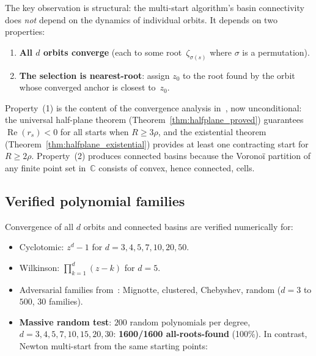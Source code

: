 \documentclass[10pt,a4paper,oneside]{book}
\theoremstyle{definition}
\theoremstyle{remark}
\begin{document}
The key observation is structural: the multi-start algorithm's basin connectivity does \emph{not} depend on the dynamics of individual orbits.  It depends on two properties:
\begin{enumerate}[nosep]
\item \textbf{All $d$ orbits converge} (each to some root~$\zeta_{\sigma(s)}$ where $\sigma$ is a permutation).
\item \textbf{The selection is nearest-root}: assign $z_0$ to the root found by the orbit whose converged anchor is closest to~$z_0$.
\end{enumerate}
Property~(1) is the content of the convergence analysis in~\cite{Besevic2026g}, now unconditional: the universal half-plane theorem (Theorem~\ref{thm:halfplane_proved}) guarantees $\operatorname{Re}(r_s) < 0$ for all starts when $R \geq 3\rho$, and the existential theorem (Theorem~\ref{thm:halfplane_existential}) provides at least one contracting start for $R \geq 2\rho$.  Property~(2) produces connected basins because the Vorono\"i partition of any finite point set in~$\mathbb{C}$ consists of convex, hence connected, cells.

\subsection{Verified polynomial families}

Convergence of all $d$ orbits and connected basins are verified numerically for:
\begin{itemize}[nosep]
\item Cyclotomic: $z^d - 1$ for $d = 3, 4, 5, 7, 10, 20, 50$.
\item Wilkinson: $\prod_{k=1}^d (z - k)$ for $d = 5$.
\item Adversarial families from~\cite{Besevic2026g}: Mignotte, clustered, Chebyshev, random ($d = 3$ to $500$, $30$ families).
\item \textbf{Massive random test}: $200$ random polynomials per degree, $d = 3, 4, 5, 7, 10, 15, 20, 30$: \textbf{1600/1600 all-roots-found} (100\%).  In contrast, Newton multi-start from the same starting points:
\end{itemize}
\end{document}

